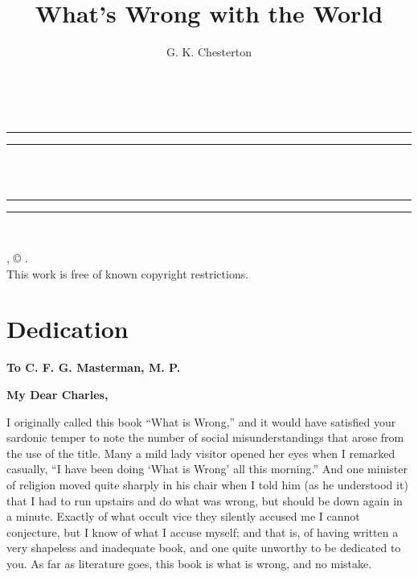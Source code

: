 \documentclass{book}
\date{}
\title{What’s Wrong with the World}
\author{G. K. Chesterton}
\begin{document}
\thispagestyle{empty}
\begin{center}
	{\Huge \@title   \\[5mm]}
\end{center}
\newpage
\thispagestyle{empty}
\cleardoublepage
\begin{center}
	\thispagestyle{empty}
	\vspace*{\baselineskip}
	\rule{\textwidth}{1.6pt}\vspace*{-\baselineskip}\vspace*{2pt}
	\rule{\textwidth}{0.4pt}\\[\baselineskip]
	{\Huge\scshape \@title   \\[5mm]}
	{\Large }
	\rule{\textwidth}{0.4pt}\vspace*{-\baselineskip}\vspace{3.2pt}
	\rule{\textwidth}{1.6pt}\\[\baselineskip]
	\vspace*{4\baselineskip}
	{\Large \@author}
	\vfill
\end{center}
\pagebreak
\newpage
\thispagestyle{empty}
\null\vfill
\noindent
\begin{center}
	{\emph{\@title}, © \@author.\\[5mm]}
	{This work is free of known copyright restrictions.\\[5mm]}
\end{center}
\pagebreak
\newpage
\setcounter{tocdepth}{0}
\setcounter{secnumdepth}{0}


\chapter*{Dedication}
\label{chapter-0}
\textbf{To C. F. G. Masterman, M. P.}

\textbf{My Dear Charles,}

I originally called this book “What is Wrong,” and it would have satisfied your sardonic temper to note the number of social misunderstandings that arose from the use of the title. Many a mild lady visitor opened her eyes when I remarked casually, “I have been doing ‘What is Wrong’ all this morning.” And one minister of religion moved quite sharply in his chair when I told him (as he understood it) that I had to run upstairs and do what was wrong, but should be down again in a minute. Exactly of what occult vice they silently accused me I cannot conjecture, but I know of what I accuse myself; and that is, of having written a very shapeless and inadequate book, and one quite unworthy to be dedicated to you. As far as literature goes, this book is what is wrong, and no mistake.
\end{document}
